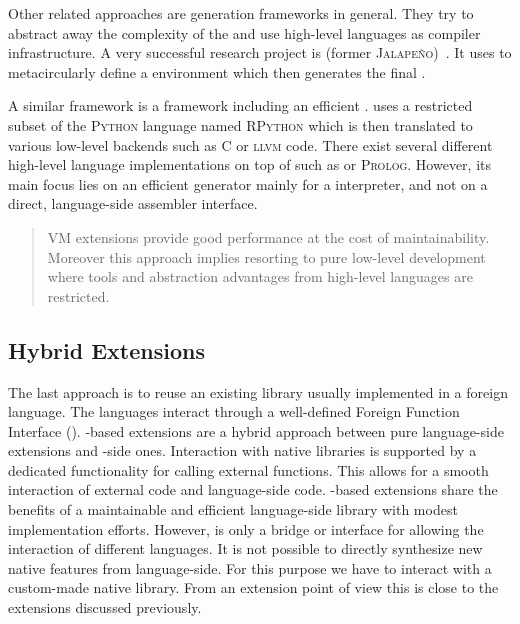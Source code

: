 Other related approaches are \VM generation frameworks in general.
They try to abstract away the complexity of the \VM and use high-level languages as compiler infrastructure.
A very successful research project is  (former \textsc{Jalapeño})~\cite{Alpe99a}.
It uses \Java to metacircularly define a \Java environment which then generates the final \VM.

A similar framework is  \cite{Rigo06a} a \VM framework including an efficient \JIT. 
\PyPy uses a restricted subset of the  \textsc{Python} language named \textsc{RPython} which is then translated to various low-level backends such as C or \textsc{llvm} code.
There exist several different high-level language \VM implementations on top of \PyPy such as \ST \cite{Bolz08a} or \textsc{Prolog}.
However, its main focus lies on an efficient \JIT generator mainly for a \Python interpreter, and not on a direct, language-side assembler interface.


\begin{quote}
VM extensions provide good performance at the cost of maintainability. 
Moreover this approach implies resorting to pure low-level development where tools and abstraction advantages from high-level languages are restricted.
\end{quote}

\subsection{Hybrid Extensions}

The last approach is to reuse an existing library usually implemented in a foreign language.
The languages interact through a well-defined Foreign Function Interface (\FFI).
\FFI-based extensions are a hybrid approach between pure language-side extensions and \VM-side ones.
Interaction with native libraries is supported by a dedicated \VM functionality for calling external functions.
This allows for a smooth interaction of external code and language-side code.
\FFI-based extensions share the benefits of a maintainable and efficient language-side library with modest implementation efforts.
However, \FFI is only a bridge or interface for allowing the interaction of different languages. 
It is not possible to directly synthesize new native features from language-side.
For this purpose we have to interact with a custom-made native library.
From an extension point of view this is close to the \VM extensions discussed previously.

